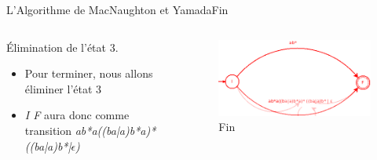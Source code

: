 \documentclass{beamer}
\begin{document}
\begin{frame}{L'Algorithme de MacNaughton et Yamada}{Fin}
        \begin{columns}[T]
     \begin{column}{.48\textwidth}
         {\fontsize{8}{9}\selectfont Élimination de l'état 3.}
         \begin{itemize}
         
             \item {\fontsize{7}{8}\selectfont Pour terminer, nous allons éliminer l'état 3}
             \item {\fontsize{7}{8}\selectfont \textit{I F} aura donc comme transition \textit{ab*a((ba|a)b*a)* ((ba|a)b*|$\epsilon$)}  }
             
             
         \end{itemize}
     \end{column}
     
     \begin{column}{.48\textwidth}
     \begin{figure}
     \includegraphics[scale=0.37]{Diagramme5_2.png}
     \centering
     \caption{Fin}     
     \end{figure}
     \end{column}
        
     \end{columns}
\end{frame}
\end{document}

